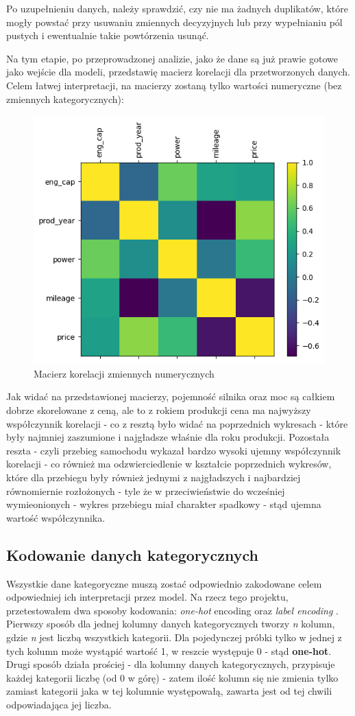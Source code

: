 \documentclass{article}
\begin{document}
Po uzupełnieniu danych, należy sprawdzić, czy nie ma żadnych duplikatów, które mogły powstać przy usuwaniu zmiennych decyzyjnych lub przy wypełnianiu pól pustych i ewentualnie takie powtórzenia usunąć.

Na tym etapie, po przeprowadzonej analizie, jako że dane są już prawie gotowe jako wejście dla modeli, przedstawię macierz korelacji dla przetworzonych danych. Celem łatwej interpretacji, na macierzy zostaną tylko wartości numeryczne (bez zmiennych kategorycznych):

\begin{figure}[H]
    \centering
    \includegraphics[width=0.75\linewidth]{images/macierz_korelacji.png}
    \caption{Macierz korelacji zmiennych numerycznych}
\end{figure}

Jak widać na przedstawionej macierzy, pojemność silnika oraz moc są całkiem dobrze skorelowane z ceną, ale to z rokiem produkcji cena ma najwyższy współczynnik korelacji - co z resztą było widać na poprzednich wykresach - które były najmniej zaszumione i najgładsze właśnie dla roku produkcji. Pozostała reszta - czyli przebieg samochodu wykazał bardzo wysoki ujemny współczynnik korelacji - co również ma odzwierciedlenie w kształcie poprzednich wykresów, które dla przebiegu były również jednymi z najgładszych i najbardziej równomiernie rozłożonych - tyle że w przeciwieństwie do wcześniej wymieonionych - wykres przebiegu miał charakter spadkowy - stąd ujemna wartość współczynnika.

\subsection{Kodowanie danych kategorycznych}
Wszystkie dane kategoryczne muszą zostać odpowiednio zakodowane celem odpowiedniej ich interpretacji przez model. Na rzecz tego projektu, przetestowałem dwa sposoby kodowania: \textit{one-hot} encoding oraz \textit{label encoding} \cite{encoding_types}. Pierwszy sposób dla jednej kolumny danych kategorycznych tworzy \textit{n} kolumn, gdzie \textit{n} jest liczbą wszystkich kategorii. Dla pojedynczej próbki tylko w jednej z tych kolumn może wystąpić wartość 1, w reszcie występuje 0 - stąd \textbf{one-hot}. Drugi sposób działa prościej - dla kolumny danych kategorycznych, przypisuje każdej kategorii liczbę (od 0 w górę) - zatem ilość kolumn się nie zmienia tylko zamiast kategorii jaka w tej kolumnie występowałą, zawarta jest od tej chwili odpowiadająca jej liczba.
\end{document}
